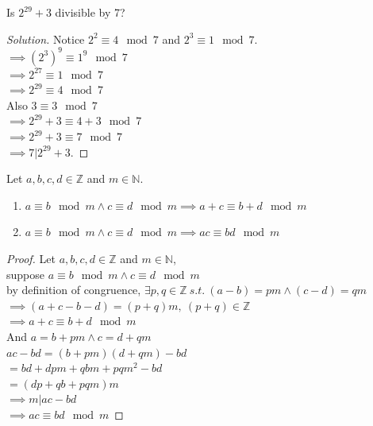 \documentclass[10pt]{article}
\begin{document}
	\begin{example}[Application 2]
		Is $2^{29} + 3$ divisible by 7? \\ 
		\begin{proof}[Solution] Notice $2^2 \equiv 4 \mod 7$ and $2^3 \equiv 1 \mod 7$. \\
		$\implies (2^3)^9 \equiv 1^9 \mod 7$ \\
		$\implies 2^{27} \equiv 1 \mod 7 $ \\
		$\implies 2^{29} \equiv 4 \mod 7 $ \\
		Also $3 \equiv 3 \mod 7$ \\
		$\implies 2^{29} + 3 \equiv 4 + 3 \mod 7$ \\
		$\implies 2^{29} + 3 \equiv 7 \mod 7$ \\
		$\implies 7 | 2^{29}+3$.
		\end{proof}
	\end{example}
	
	\begin{theorem}
		Let $a, b, c, d \in \mathbb{Z}$ and $m \in \mathbb{N}$.
		\begin{enumerate}
			\item $a \equiv b \mod m \land c \equiv d \mod m \implies a + c \equiv b + d \mod m$
			\item $a \equiv b \mod m \land c \equiv d \mod m \implies ac \equiv bd \mod m$
		\end{enumerate}
	\end{theorem}
	
	\begin{proof}
		Let $a, b, c, d \in \mathbb{Z}$ and $m \in \mathbb{N}$, \\
		suppose $a \equiv b \mod m \land c \equiv d \mod m$ \\
		by definition of congruence, $\exists p, q\in \mathbb{Z}\ s.t.\ (a-b) = pm \land (c-d) = qm$\\
		$\implies (a+c-b-d) = (p+q)m,\ (p+q) \in \mathbb{Z}$ \\
		$\implies a + c \equiv b + d \mod m$ \\
		And $a = b + pm \land c = d + qm$ \\
		$ac - bd = (b + pm)(d+qm) - bd$ \\
		$=bd +dpm + qbm + pqm^2 - bd$ \\
		$=(dp+qb+pqm)m$ \\
		$\implies m | ac-bd$ \\
		$\implies ac \equiv bd \mod m$ 
	\end{proof}
	
\end{document}
